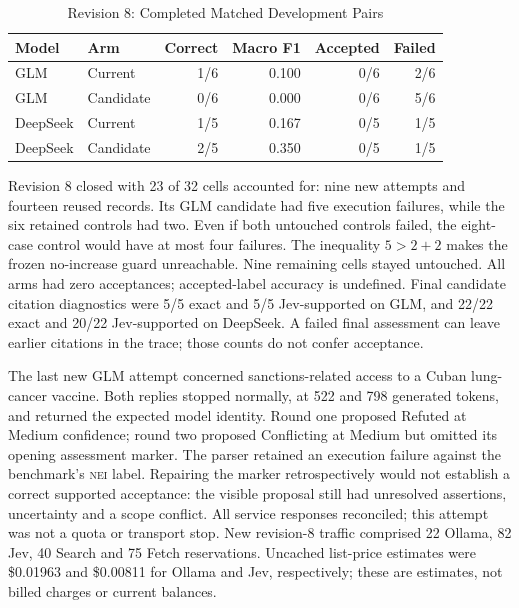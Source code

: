 \documentclass[conference]{IEEEtran}
\newcommand{\NEI}{\textsc{nei}}
\begin{document}
\begin{table}[t]
\caption{Revision 8: Completed Matched Development Pairs}
\label{tab:flash-v8}
\centering
\footnotesize
\begin{tabular}{@{}llrrrr@{}}
\toprule
Model & Arm & Correct & Macro F1 & Accepted & Failed\\
\midrule
GLM & Current & 1/6 & 0.100 & 0/6 & 2/6\\
GLM & Candidate & 0/6 & 0.000 & 0/6 & 5/6\\
DeepSeek & Current & 1/5 & 0.167 & 0/5 & 1/5\\
DeepSeek & Candidate & 2/5 & 0.350 & 0/5 & 1/5\\
\bottomrule
\end{tabular}
\end{table}

Revision 8 closed with 23 of 32 cells accounted for: nine new attempts and fourteen reused records. Its GLM candidate had five execution failures, while the six retained controls had two. Even if both untouched controls failed, the eight-case control would have at most four failures. The inequality $5>2+2$ makes the frozen no-increase guard unreachable. Nine remaining cells stayed untouched. All arms had zero acceptances; accepted-label accuracy is undefined. Final candidate citation diagnostics were 5/5 exact and 5/5 Jev-supported on GLM, and 22/22 exact and 20/22 Jev-supported on DeepSeek. A failed final assessment can leave earlier citations in the trace; those counts do not confer acceptance.

The last new GLM attempt concerned sanctions-related access to a Cuban lung-cancer vaccine. Both replies stopped normally, at 522 and 798 generated tokens, and returned the expected model identity. Round one proposed Refuted at Medium confidence; round two proposed Conflicting at Medium but omitted its opening assessment marker. The parser retained an execution failure against the benchmark's \NEI{} label. Repairing the marker retrospectively would not establish a correct supported acceptance: the visible proposal still had unresolved assertions, uncertainty and a scope conflict. All service responses reconciled; this attempt was not a quota or transport stop. New revision-8 traffic comprised 22 Ollama, 82 Jev, 40 Search and 75 Fetch reservations. Uncached list-price estimates were \$0.01963 and \$0.00811 for Ollama and Jev, respectively; these are estimates, not billed charges or current balances.
\end{document}
